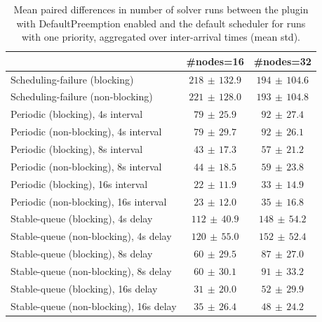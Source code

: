 \begin{table}[t]
\tiny
\setlength{\tabcolsep}{1.2pt}
\renewcommand{\arraystretch}{1.12}
\centering
\caption{Mean paired differences in number of solver runs between the plugin with DefaultPreemption enabled and the default scheduler for runs with one priority, aggregated over inter-arrival times (mean \pm std).}
\label{tab:solver_runs-defpreempt1-prio1-std1-agg-arrival}
\begin{tabular}{l c c}
\toprule
 & \#nodes=16 & \#nodes=32 \\
\midrule
Scheduling-failure (blocking) & $218\,\pm\,132.9$ & $194\,\pm\,104.6$ \\
Scheduling-failure (non-blocking) & $221\,\pm\,128.0$ & $193\,\pm\,104.8$ \\
Periodic (blocking), 4s interval & $79\,\pm\,25.9$ & $92\,\pm\,27.4$ \\
Periodic (non-blocking), 4s interval & $79\,\pm\,29.7$ & $92\,\pm\,26.1$ \\
Periodic (blocking), 8s interval & $43\,\pm\,17.3$ & $57\,\pm\,21.2$ \\
Periodic (non-blocking), 8s interval & $44\,\pm\,18.5$ & $59\,\pm\,23.8$ \\
Periodic (blocking), 16s interval & $22\,\pm\,11.9$ & $33\,\pm\,14.9$ \\
Periodic (non-blocking), 16s interval & $23\,\pm\,12.0$ & $35\,\pm\,16.8$ \\
Stable-queue (blocking), 4s delay & $112\,\pm\,40.9$ & $148\,\pm\,54.2$ \\
Stable-queue (non-blocking), 4s delay & $120\,\pm\,55.0$ & $152\,\pm\,52.4$ \\
Stable-queue (blocking), 8s delay & $60\,\pm\,29.5$ & $87\,\pm\,27.0$ \\
Stable-queue (non-blocking), 8s delay & $60\,\pm\,30.1$ & $91\,\pm\,33.2$ \\
Stable-queue (blocking), 16s delay & $31\,\pm\,20.0$ & $52\,\pm\,29.9$ \\
Stable-queue (non-blocking), 16s delay & $35\,\pm\,26.4$ & $48\,\pm\,24.2$ \\
\bottomrule
\end{tabular}
\end{table}
